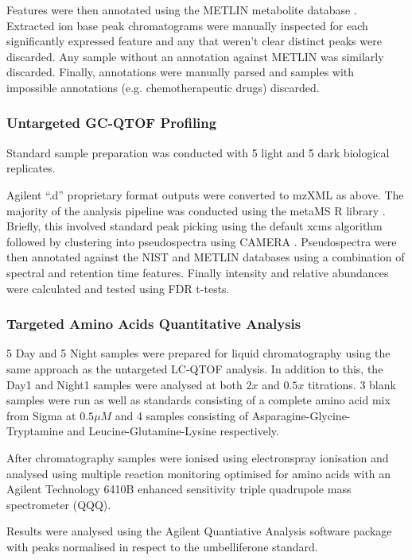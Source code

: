 Features were then annotated using the METLIN metabolite database \citep{Smith2005a,Sana2008,Tautenhahn2012a}.
Extracted ion base peak chromatograms were manually inspected for each significantly expressed feature
and any that weren't clear distinct peaks were discarded. Any sample without
an annotation against METLIN was similarly discarded. Finally, annotations
were manually parsed and samples with impossible annotations (e.g. 
chemotherapeutic drugs) discarded.  

\subsubsection{Untargeted GC-QTOF Profiling}

Standard sample preparation was conducted 
with 5 light and 5 dark biological replicates.  

Agilent ``.d'' proprietary format outputs were converted to mzXML as above.
The majority of the analysis pipeline was conducted using the metaMS R library
\citep{Wehrens2014}.  Briefly, this involved standard peak picking using the
default xcms algorithm \citep{Smith2006} followed by clustering into
pseudospectra using CAMERA \citep{Kuhl2012}.  Pseudospectra were then annotated
against the NIST and METLIN databases using a combination of spectral
and retention time features.  Finally intensity and relative abundances
were calculated and tested using FDR t-tests.

\subsubsection{Targeted Amino Acids Quantitative Analysis}

5 Day and 5 Night samples were prepared for liquid chromatography
using the same approach as the untargeted LC-QTOF analysis.
In addition to this, the Day1 and Night1 samples were analysed at both
\(2x\) and \(0.5x\) titrations.  3 blank samples were run 
as well as standards consisting of a complete amino acid
mix from Sigma at \(0.5\mu M\) and 4 samples consisting of Asparagine-Glycine-Tryptamine
and Leucine-Glutamine-Lysine respectively.

After chromatography samples were ionised using electronspray ionisation
and analysed using multiple reaction monitoring optimised
for amino acids with an Agilent Technology
6410B enhanced sensitivity triple quadrupole mass spectrometer (QQQ).

Results were analysed using the Agilent Quantiative Analysis software package
with peaks normalised in respect to the umbelliferone standard. 

